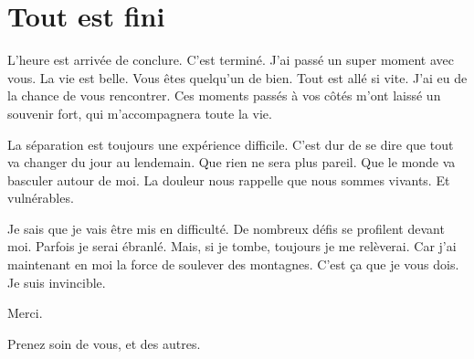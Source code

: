 \chapter{Tout est fini}
	\minitoc




L'heure est arrivée de conclure.
C'est terminé.
J'ai passé un super moment avec vous.
La vie est belle.
Vous êtes quelqu'un de bien.
Tout est allé si vite.
J'ai eu de la chance de vous rencontrer.
Ces moments passés à vos côtés m'ont laissé un souvenir fort, qui m'accompagnera toute la vie.

La séparation est toujours une expérience difficile.
C'est dur de se dire que tout va changer du jour au lendemain.
Que rien ne sera plus pareil.
Que le monde va basculer autour de moi.
La douleur nous rappelle que nous sommes vivants.
Et vulnérables.

Je sais que je vais être mis en difficulté.
De nombreux défis se profilent devant moi.
Parfois je serai ébranlé.
Mais, si je tombe, toujours je me relèverai.
Car j'ai maintenant en moi la force de soulever des montagnes.
C'est ça que je vous dois.
Je suis invincible.

\hfill Merci.

\vfill Prenez soin de vous, et des autres.
